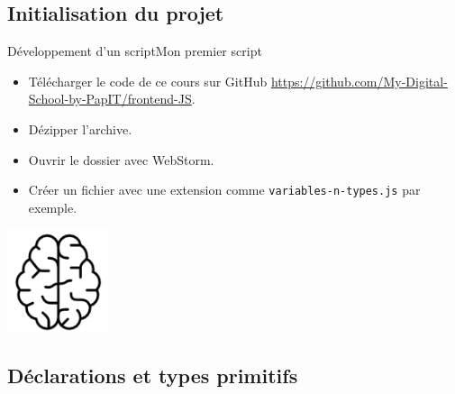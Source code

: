 \documentclass{beamer}
\begin{document}
    \subsection{Initialisation du projet}\label{subsec:projectinit}

    \begin{frame}{Développement d'un script}{Mon premier script}
        \begin{itemize}
            \item Télécharger le code de ce cours sur GitHub \url{https://github.com/My-Digital-School-by-PapIT/frontend-JS}.
            \item Dézipper l'archive.
            \item Ouvrir le dossier avec WebStorm.
            \item Créer un fichier avec une extension comme \lstinline{variables-n-types.js} par exemple.
        \end{itemize}
        \bigbreak
        \centering
        \includegraphics[width=3cm]{image/intelligence}
    \end{frame}

    \subsection{Déclarations et types primitifs}\label{subsec:declare-n-types}
\end{document}
